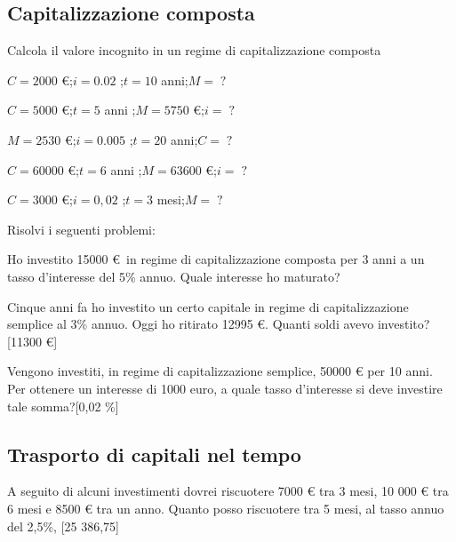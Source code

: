 \subsection{Capitalizzazione composta}
\begin{esercizio}
Calcola il valore incognito in un regime di capitalizzazione composta
 \begin{enumeratea}
 \item $C = 2000$ \euro ;\quad $i = 0.02$ ;\quad $t = 10$ anni;\quad $M=\;?$
 \item $C = 5000$ \euro ;\quad $t = 5$ anni ;\quad $M = 5750$ \euro;\quad $i=\;?$ 
 \item $M = 2530$ \euro ;\quad $i = 0.005$ ;\quad $t = 20$ anni;\quad $C=\;?$ \hfill

 \item $C = 60000$ \euro ;\quad $t = 6$ anni ;\quad $M = 63600$ \euro;\quad $i=\;?$ \hfill 

 \item $C = 3000$ \euro ;\quad $i = 0,02$ ;\quad $t = 3$ mesi;\quad $M=\;?$ \hfill

 \end{enumeratea}
\end{esercizio}


\begin{esercizio}
Risolvi i seguenti problemi:
 \begin{enumeratea}
  \item Ho investito 15000 \euro\, in regime di capitalizzazione composta per 3 anni a un tasso d'interesse del 5\% annuo. Quale interesse ho maturato?\hfill
  \item Cinque anni fa ho investito un certo capitale in regime di capitalizzazione semplice al 3\% annuo. Oggi ho ritirato 12995 \euro. Quanti soldi avevo investito?\hfill [11300 \euro]
  \item Vengono investiti, in regime di capitalizzazione semplice, 50000 \euro\; per 10 anni. Per ottenere un interesse di 1000 euro, a quale tasso d'interesse si deve investire tale somma?\hfill [0,02 \%]
 \end{enumeratea}
\end{esercizio}


\subsection{Trasporto di capitali nel tempo}
\begin{esercizio}
A seguito di alcuni investimenti dovrei riscuotere 7000 € tra 3 mesi, 10 000 € tra 6 mesi e 8500 € tra un anno. Quanto posso riscuotere tra 5 mesi, al tasso annuo del 2,5\%,
\hfill[25 386,75]
\end{esercizio}

